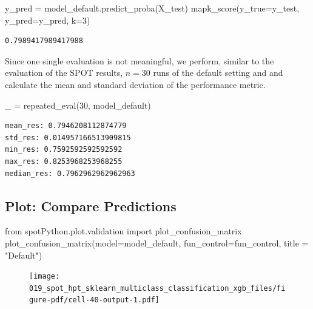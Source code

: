 \documentclass[
  letterpaper,
  DIV=11,
  numbers=noendperiod]{scrreprt}
\newenvironment{Shaded}{\begin{snugshade}}{\end{snugshade}}
\newcommand{\DecValTok}[1]{\textcolor[rgb]{0.68,0.00,0.00}{#1}}
\newcommand{\ImportTok}[1]{\textcolor[rgb]{0.00,0.46,0.62}{#1}}
\newcommand{\NormalTok}[1]{\textcolor[rgb]{0.00,0.23,0.31}{#1}}
\newcommand{\OperatorTok}[1]{\textcolor[rgb]{0.37,0.37,0.37}{#1}}
\newcommand{\StringTok}[1]{\textcolor[rgb]{0.13,0.47,0.30}{#1}}
\begin{document}
\begin{Shaded}
\begin{Highlighting}[]
\NormalTok{y\_pred }\OperatorTok{=}\NormalTok{ model\_default.predict\_proba(X\_test)}
\NormalTok{mapk\_score(y\_true}\OperatorTok{=}\NormalTok{y\_test, y\_pred}\OperatorTok{=}\NormalTok{y\_pred, k}\OperatorTok{=}\DecValTok{3}\NormalTok{)}
\end{Highlighting}
\end{Shaded}

\begin{verbatim}
0.7989417989417988
\end{verbatim}

Since one single evaluation is not meaningful, we perform, similar to
the evaluation of the SPOT results, \(n=30\) runs of the default setting
and and calculate the mean and standard deviation of the performance
metric.

\begin{Shaded}
\begin{Highlighting}[]
\NormalTok{\_ }\OperatorTok{=}\NormalTok{ repeated\_eval(}\DecValTok{30}\NormalTok{, model\_default)}
\end{Highlighting}
\end{Shaded}

\begin{verbatim}
mean_res: 0.7946208112874779
std_res: 0.014957166513909815
min_res: 0.7592592592592592
max_res: 0.8253968253968255
median_res: 0.7962962962962963
\end{verbatim}

\hypertarget{plot-compare-predictions-2}{%
\subsection{Plot: Compare
Predictions}\label{plot-compare-predictions-2}}

\begin{Shaded}
\begin{Highlighting}[]
\ImportTok{from}\NormalTok{ spotPython.plot.validation }\ImportTok{import}\NormalTok{ plot\_confusion\_matrix}
\NormalTok{plot\_confusion\_matrix(model}\OperatorTok{=}\NormalTok{model\_default, fun\_control}\OperatorTok{=}\NormalTok{fun\_control, title }\OperatorTok{=} \StringTok{"Default"}\NormalTok{)}
\end{Highlighting}
\end{Shaded}

\begin{figure}[H]

{\centering \texttt{[image: 019\_spot\_hpt\_sklearn\_multiclass\_classification\_xgb\_files/figure-pdf/cell-40-output-1.pdf]}

}

\end{figure}
\end{document}
